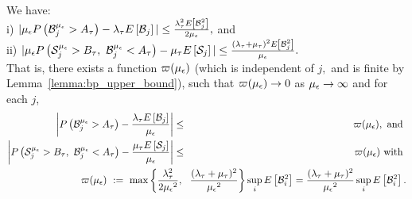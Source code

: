 \begin{lemma}
	\label{Lemma_Intermediate_result}
We have:  \\  
i) $ |{\mu_\epsilon} P\left(\mathcal{B}^{{\mu_\epsilon}}_j > A_{\tau}\right) - \lambda_{\tau}
E\left[\mathcal{B}_j\right]| \leq \frac{\lambda_{{\tau}}^2E\left[\mathcal{B}^2_j\right]}{2{\mu_\epsilon}},$ and \\
ii)   %
$|{\mu_\epsilon} P\left(\mathcal{S}^{{\mu_\epsilon}}_j > B_{\tau},\ \mathcal{B}^{{\mu_\epsilon}}_j < A_{\tau}\right) - \mu_{\tau}
E\left[\mathcal{S}_j\right]| \leq \frac{(\lambda_{\tau}+
  \mu_{\tau})^2E\left[\mathcal{B}^2_j\right]}{{\mu_\epsilon}}.$ \\
That is, there exists a function $\varpi ({\mu_\epsilon})$ (which is independent
of $j,$ and  is finite  by  Lemma~\ref{lemma:bp_upper_bound}), such that
$\varpi ({\mu_\epsilon}) \to 0$ as ${\mu_\epsilon} \to \infty$ and for each $j$,
\begin{eqnarray*}
  \left | \prob{\B_j^{\mue} > A_\t} - \frac{\lambda_\t \Exp{\B_j }}{\mue}  \right | 
  &\le  &  \varpi (\mue),  
          \mbox{  and  }  \\
  \left | 	  \prob{\S_j^{\mue} > B_\t,\
  \B^{\mue}_j < A_\t}  - \frac{  \mu_\t \Exp{\S_j} } {\mue} \right | 
% 
% 
  & \le&   \varpi (\mue) \mbox{ with }  \\ 
  && \hspace{-40mm}
     \varpi (\mue) \  :=  \  \max \left \{    \frac{\lambda_{\t}^2}{2\mue^2} ,    \  \       \frac{(\lambda_\t+
     \mu_\t)^2}{\mue^2}     \right \}  \sup_i  \Exp{\B_i^2}  =  \frac{(\lambda_\t+
     \mu_\t)^2}{\mue^2}      \sup_i  \Exp{\B_i^2}  .
\end{eqnarray*}
\end{lemma}


